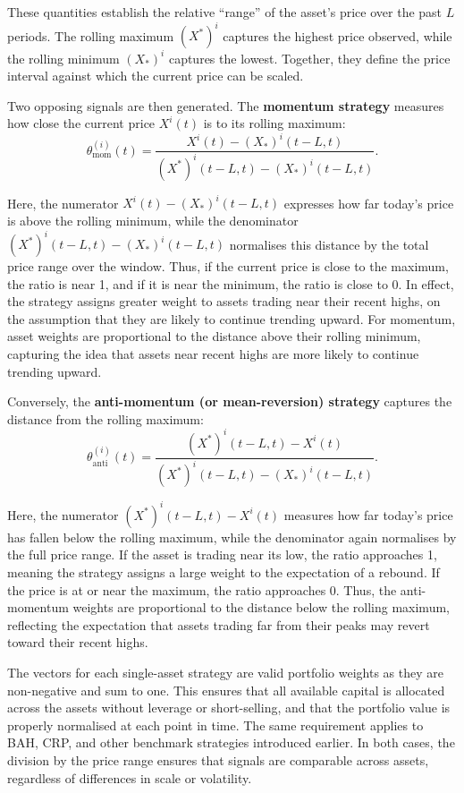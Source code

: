 \documentclass[12pt,a4paper]{report}
\begin{document}
These quantities establish the relative ``range'' of the asset’s price over the past \( L \) periods. The rolling maximum \((X^*)^i\) captures the highest price observed, while the rolling minimum \((X_*)^i\) captures the lowest. Together, they define the price interval against which the current price can be scaled.

Two opposing signals are then generated. The \textbf{momentum strategy} measures how close the current price \( X^i(t) \) is to its rolling maximum:
\begin{equation}
\theta^{(i)}_{\text{mom}}(t) = \frac{ X^i(t) - (X_*)^i(t-L, t) }{ (X^*)^i(t-L, t) - (X_*)^i(t-L, t) }.
\label{eq:momentum}
\end{equation}

Here, the numerator \( X^i(t) - (X_*)^i(t-L, t) \) expresses how far today’s price is above the rolling minimum, while the denominator \( (X^*)^i(t-L, t) - (X_*)^i(t-L, t) \) normalises this distance by the total price range over the window. Thus, if the current price is close to the maximum, the ratio is near 1, and if it is near the minimum, the ratio is close to 0. In effect, the strategy assigns greater weight to assets trading near their recent highs, on the assumption that they are likely to continue trending upward. For momentum, asset weights are proportional to the distance above their rolling minimum, capturing the idea that assets near recent highs are more likely to continue trending upward.

Conversely, the \textbf{anti-momentum (or mean-reversion) strategy} captures the distance from the rolling maximum:
\begin{equation}
\theta^{(i)}_{\text{anti}}(t) = \frac{ (X^*)^i(t-L, t) - X^i(t) }{ (X^*)^i(t-L, t) - (X_*)^i(t-L, t) }.
\label{eq:anti_momentum}
\end{equation}

Here, the numerator \( (X^*)^i(t-L, t) - X^i(t) \) measures how far today’s price has fallen below the rolling maximum, while the denominator again normalises by the full price range. If the asset is trading near its low, the ratio approaches 1, meaning the strategy assigns a large weight to the expectation of a rebound. If the price is at or near the maximum, the ratio approaches 0. Thus, the anti-momentum weights are proportional to the distance below the rolling maximum, reflecting the expectation that assets trading far from their peaks may revert toward their recent highs.

The vectors for each single-asset strategy are valid portfolio weights as they are non-negative and sum to one. This ensures that all available capital is allocated across the assets without leverage or short-selling, and that the portfolio value is properly normalised at each point in time. The same requirement applies to BAH, CRP, and other benchmark strategies introduced earlier. In both cases, the division by the price range ensures that signals are comparable across assets, regardless of differences in scale or volatility.
\end{document}
